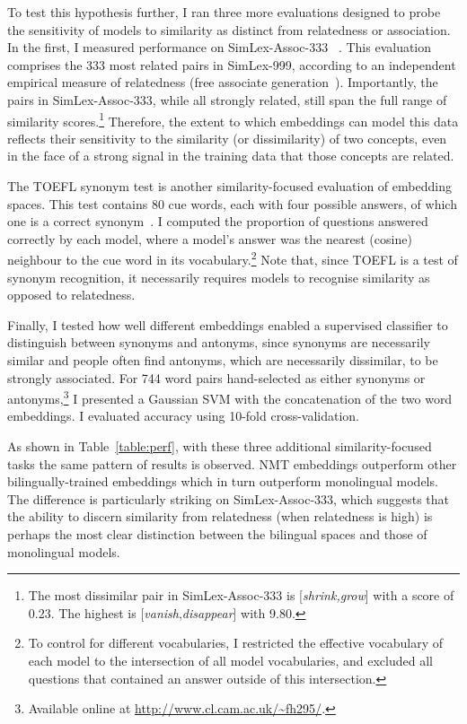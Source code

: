 To test this hypothesis further, I ran three more evaluations designed to probe the sensitivity of models to similarity as distinct from relatedness or association. In the first, I measured performance on SimLex-Assoc-333 ~\citep{hill2014simlex}. This evaluation comprises the 333 most related pairs in SimLex-999, according to an independent empirical measure of relatedness (free associate generation~\citep{nelson2004university}). Importantly, the pairs in SimLex-Assoc-333, while all strongly related, still span the full range of similarity scores.\footnote{The most dissimilar pair in SimLex-Assoc-333 is [\emph{shrink,grow}] with a score of 0.23. The highest is [\emph{vanish},\emph{disappear}] with 9.80.} Therefore, the extent to which embeddings can model this data reflects their sensitivity to the similarity (or dissimilarity) of two concepts, even in the face of a strong signal in the training data that those concepts are related.    

The TOEFL synonym test is another similarity-focused evaluation of embedding spaces. This test contains 80 cue words, each with four possible answers, of which one is a correct synonym~\citep{landauer1997solution}. I computed the proportion of questions answered correctly by each model, where a model's answer was the nearest (cosine) neighbour to the cue word in its vocabulary.\footnote{To control for different vocabularies, I restricted the effective vocabulary of each model to the intersection of all model vocabularies, and excluded all questions that contained an answer outside of this intersection.} Note that, since TOEFL is a test of synonym recognition, it necessarily requires models to recognise similarity as opposed to relatedness.  

Finally, I tested how well different embeddings enabled a supervised classifier to distinguish between synonyms and antonyms, since synonyms are necessarily similar and people often find antonyms, which are necessarily dissimilar, to be strongly associated. For 744 word pairs hand-selected as either synonyms or antonyms,\footnote{Available online at \url{http://www.cl.cam.ac.uk/~fh295/}.} I presented a Gaussian SVM with the concatenation of the two word embeddings. I evaluated accuracy using 10-fold cross-validation. 

As shown in Table~\ref{table:perf}, with these three additional similarity-focused tasks the same pattern of results is observed. NMT embeddings outperform other bilingually-trained embeddings which in turn outperform monolingual models. The difference is particularly striking on SimLex-Assoc-333, which suggests that the ability to discern similarity from relatedness (when relatedness is high) is perhaps the most clear distinction between the bilingual spaces and those of monolingual models. 


